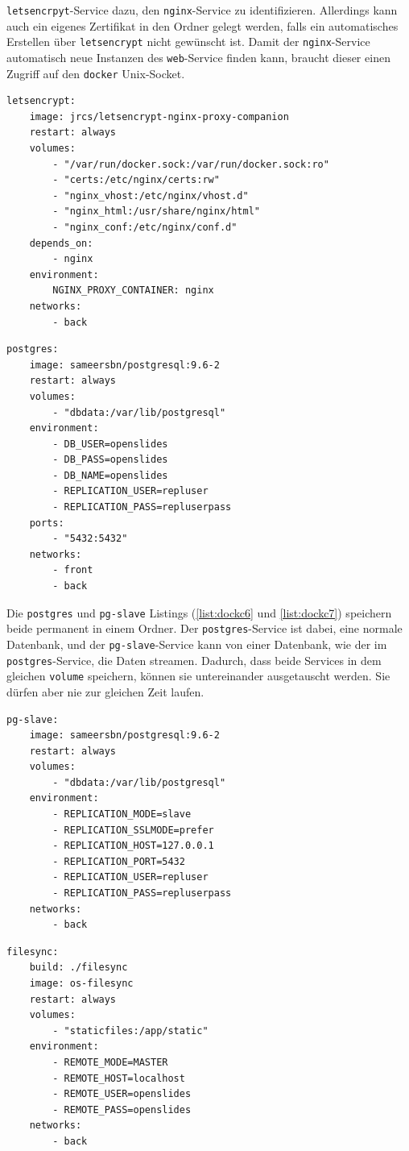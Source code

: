\documentclass[11pt,a4paper]{article}
\begin{document}
\texttt{letsencrpyt}-Service dazu, den \texttt{nginx}-Service zu 
identifizieren. Allerdings kann auch ein eigenes Zertifikat in den Ordner 
gelegt werden, falls ein automatisches Erstellen über \texttt{letsencrypt} 
nicht gewünscht ist. Damit der \texttt{nginx}-Service automatisch neue 
Instanzen des \texttt{web}-Service finden kann, braucht dieser einen Zugriff 
auf den \texttt{docker} Unix-Socket.
\begin{lstlisting}[firstnumber=83,
	caption=\texttt{docker-compose.yml} Teil 6 - 
	\cite{osdockcont},
	label={list:dockc6}]
letsencrypt:
	image: jrcs/letsencrypt-nginx-proxy-companion
	restart: always
	volumes:
		- "/var/run/docker.sock:/var/run/docker.sock:ro"
		- "certs:/etc/nginx/certs:rw"
		- "nginx_vhost:/etc/nginx/vhost.d"
		- "nginx_html:/usr/share/nginx/html"
		- "nginx_conf:/etc/nginx/conf.d"
	depends_on:
		- nginx
	environment:
		NGINX_PROXY_CONTAINER: nginx
	networks:
		- back
\end{lstlisting}
\begin{lstlisting}[firstnumber=98,
	caption=\texttt{docker-compose.yml} Teil 7 - 
	\cite{osdockcont},
	label={list:dockc7}]
postgres:
	image: sameersbn/postgresql:9.6-2
	restart: always
	volumes:
		- "dbdata:/var/lib/postgresql"
	environment:
		- DB_USER=openslides
		- DB_PASS=openslides
		- DB_NAME=openslides
		- REPLICATION_USER=repluser
		- REPLICATION_PASS=repluserpass
	ports:
		- "5432:5432"
	networks:
		- front
		- back
\end{lstlisting}
Die \texttt{postgres} und \texttt{pg-slave} Listings (\ref{list:dockc6} und 
\ref{list:dockc7}) speichern beide permanent in einem Ordner. Der 
\texttt{postgres}-Service ist dabei, eine normale Datenbank, und der 
\texttt{pg-slave}-Service kann von einer Datenbank, wie der im 
\texttt{postgres}-Service, die Daten streamen. Dadurch, dass beide Services in 
dem gleichen \texttt{volume} speichern, können sie untereinander ausgetauscht 
werden. Sie dürfen aber nie zur gleichen Zeit laufen.
\begin{lstlisting}[firstnumber=114,
	caption=\texttt{docker-compose.yml} Teil 8 - 
	\cite{osdockcont},
	label={list:dockc8}]
pg-slave:
	image: sameersbn/postgresql:9.6-2
	restart: always
	volumes:
		- "dbdata:/var/lib/postgresql"
	environment:
		- REPLICATION_MODE=slave
		- REPLICATION_SSLMODE=prefer
		- REPLICATION_HOST=127.0.0.1
		- REPLICATION_PORT=5432
		- REPLICATION_USER=repluser
		- REPLICATION_PASS=repluserpass
	networks:
		- back
\end{lstlisting}
\begin{lstlisting}[firstnumber=128,
	caption=\texttt{docker-compose.yml} Teil 9 - 
	\cite{osdockcont},
	label={list:dockc9}]
filesync:
	build: ./filesync
	image: os-filesync
	restart: always
	volumes:
		- "staticfiles:/app/static"
	environment:
		- REMOTE_MODE=MASTER
		- REMOTE_HOST=localhost
		- REMOTE_USER=openslides
		- REMOTE_PASS=openslides
	networks:
		- back
\end{lstlisting}
\end{document}

